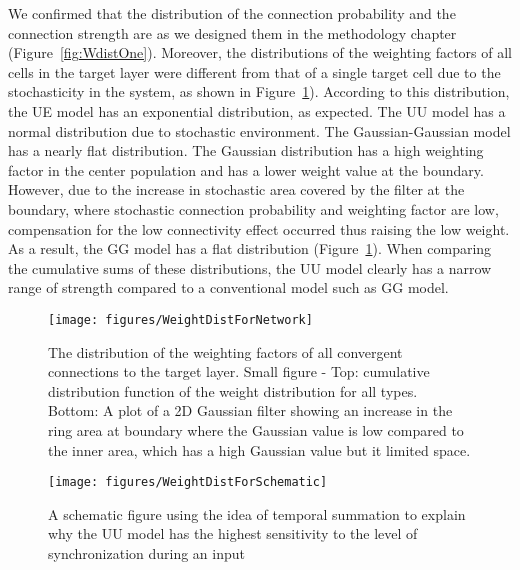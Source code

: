  We confirmed that the distribution of the connection probability and the connection strength are as we designed them in the methodology chapter (Figure~\ref{fig:WdistOne}). Moreover, the distributions of the weighting factors of all cells in the target layer were different from that of a single target cell due to the stochasticity in the system, as shown in Figure~\ref{fig:WdistNN}). According to this distribution, the UE model has an exponential distribution, as expected. The UU model has a normal distribution due to stochastic environment. The Gaussian-Gaussian model has a nearly flat distribution. The Gaussian distribution has a high weighting factor in the center population and has a lower weight value at the boundary. However, due to the increase in stochastic area covered by the filter at the boundary, where stochastic connection probability and weighting factor are low, compensation for the low connectivity effect occurred thus raising the low weight. As a result, the GG model has a flat distribution (Figure~\ref{fig:WdistNN}). When comparing the cumulative sums of these distributions, the UU model clearly has a narrow range of strength compared to a conventional model such as GG model.

\begin{figure}[!h]
	\centering
	\texttt{[image: figures/WeightDistForNetwork]}
	\caption[The distribution of the weighting factors in population]{The distribution of the weighting factors of all convergent connections to the target layer. Small figure - Top: cumulative distribution function of the weight distribution for all types. Bottom: A plot of a 2D Gaussian filter showing an increase in the ring area at boundary where the Gaussian value is low compared to the inner area, which has a high Gaussian value but it limited space.} 
	\label{fig:WdistNN}
\end{figure}


\begin{figure}[!h]
	\centering
	\texttt{[image: figures/WeightDistForSchematic]}
	\caption[The Sensitivity to Oscillation in UU model]{A schematic figure using the idea of temporal summation \cite{magee1999dendritic} to explain why the UU model has the highest sensitivity to the level of synchronization during an input} 
	\label{fig:WdistSchematic}
\end{figure}



